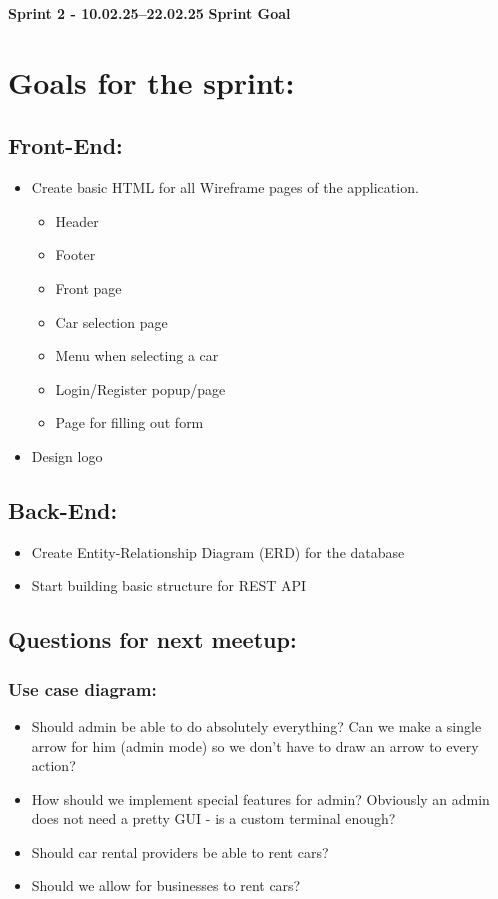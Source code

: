 \documentclass{article}
\begin{document}
\textbf{Sprint 2 - 10.02.25–22.02.25} 
\textbf{Sprint Goal} 

\section{Goals for the sprint:}

\subsection{Front-End:}
\begin{itemize}
    \item Create basic HTML for all Wireframe pages of the application.
    \begin{itemize}
        \item Header
        \item Footer
        \item Front page
        \item Car selection page
        \item Menu when selecting a car
        \item Login/Register popup/page
        \item Page for filling out form 
    \end{itemize}
    \item Design logo
\end{itemize}

\subsection{Back-End:}
\begin{itemize}
    \item Create Entity-Relationship Diagram (ERD) for the database
    \item Start building basic structure for REST API
\end{itemize}

\subsection{Questions for next meetup:}

\subsubsection{Use case diagram:}
\begin{itemize}
    \item Should admin be able to do absolutely everything? Can we make a single arrow for him (admin mode) so we don't have to draw an arrow to every action?
    \item How should we implement special features for admin? Obviously an admin does not need a pretty GUI - is a custom terminal enough?
    \item Should car rental providers be able to rent cars?
    \item Should we allow for businesses to rent cars?
\end{itemize}
\end{document}
